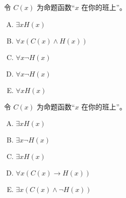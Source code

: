 {{        %
        \begin{practices}
            令 $C(x)$ 为命题函数``$x$ 在你的班上''。
            \begin{enumerate}[A.]
                \item $\exists x H(x)$
                \item $\forall x (C(x) \wedge H(x))$
                \item $\forall x \neg H(x)$
                \item $\forall x \neg H(x)$
                \item $\forall x H(x)$
            \end{enumerate}
        \end{practices}

        \begin{practices}
            令 $C(x)$ 为命题函数``$x$ 在你的班上''。
            \begin{enumerate}[A.]
                \item $\exists x H(x)$
                \item $\exists x \neg H(x)$
                \item $\exists x H(x)$
                \item $\forall x (C(x) \rightarrow H(x))$
                \item $\exists x (C(x) \wedge \neg H(x))$
            \end{enumerate}
        \end{practices}
    }
}
